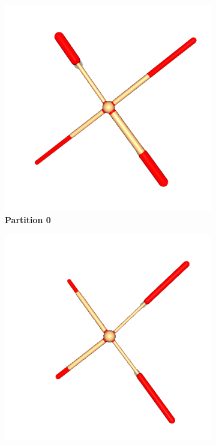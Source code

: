 \begin{figure}[!htp]
            \begin{subfigure}{\textwidth}
                \centering
                \begin{minipage}{0.19\textwidth}
                    \centering
                    \includegraphics[width=\linewidth]{resources/partition_5_2906_3/ant_0.png}
                    \textbf{Partition 0}
                \end{minipage}
                \hfill
                \begin{minipage}{0.19\textwidth}
                    \centering
                    \includegraphics[width=\linewidth]{resources/partition_5_2906_3/ant_1.png}

\end{minipage}
\end{subfigure}
\end{figure}

